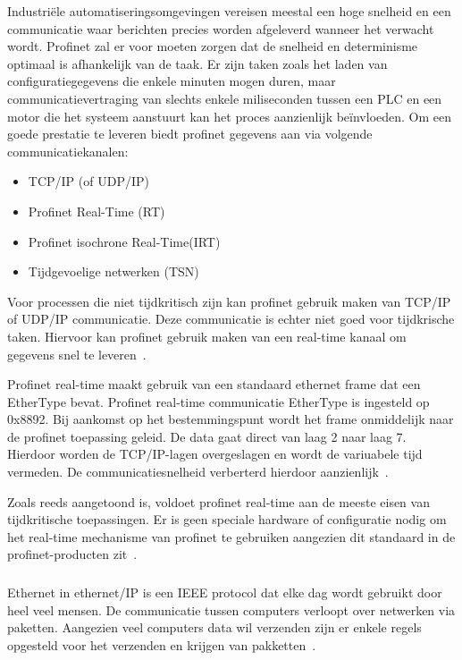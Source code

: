 Industriële automatiseringsomgevingen vereisen meestal een hoge snelheid en een communicatie waar berichten precies worden afgeleverd wanneer het verwacht wordt. Profinet zal er voor moeten zorgen dat de snelheid en determinisme optimaal is afhankelijk van de taak. Er zijn taken zoals het laden van configuratiegegevens die enkele minuten mogen duren, maar communicatievertraging van slechts enkele miliseconden tussen een PLC en een motor die het systeem aanstuurt kan het proces aanzienlijk beïnvloeden. Om een goede prestatie te leveren biedt profinet gegevens aan via volgende communicatiekanalen:
\begin{itemize}
    \item TCP/IP (of UDP/IP)
    \item Profinet Real-Time (RT)
    \item Profinet isochrone Real-Time(IRT)
    \item Tijdgevoelige netwerken (TSN)
\end{itemize}
Voor processen die niet tijdkritisch zijn kan profinet gebruik maken van TCP/IP of UDP/IP communicatie. Deze communicatie is echter niet goed voor tijdkrische taken. Hiervoor kan profinet gebruik maken van een real-time kanaal om gegevens snel te leveren~\autocite{Nelly2021}.

Profinet real-time maakt gebruik van een standaard ethernet frame dat een EtherType bevat. Profinet real-time communicatie EtherType is ingesteld op 0x8892. Bij aankomst op het bestemmingspunt wordt het frame onmiddelijk naar de profinet toepassing geleid. De data gaat direct van laag 2 naar laag 7. Hierdoor worden de TCP/IP-lagen overgeslagen en wordt de variuabele tijd vermeden. De communicatiesnelheid verberterd hierdoor aanzienlijk~\autocite{Nelly2021}.

Zoals reeds aangetoond is, voldoet profinet real-time aan de meeste eisen van tijdkritische toepassingen. Er is geen speciale hardware of configuratie nodig om het real-time mechanisme van profinet te gebruiken aangezien dit standaard in de profinet-producten zit~\autocite{Nelly2021}.

\subsubsection{}
\label{subsubsec:EtherNet/IP}
Ethernet in ethernet/IP is een IEEE protocol dat elke dag wordt gebruikt door heel veel mensen. De communicatie tussen computers verloopt over netwerken via paketten. Aangezien veel computers data wil verzenden zijn er enkele regels opgesteld voor het verzenden en krijgen van pakketten~\autocite{Realpars2019a}. 

